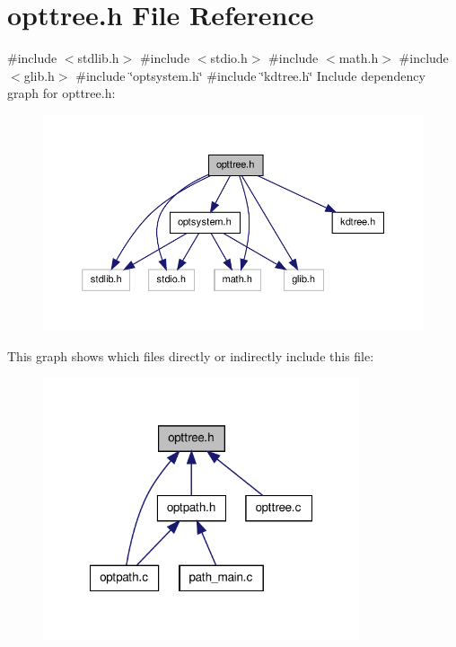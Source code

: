 \hypertarget{a00020}{\section{opttree.\-h \-File \-Reference}
\label{db/db2/a00020}
}
{\ttfamily \#include $<$stdlib.\-h$>$}\*
{\ttfamily \#include $<$stdio.\-h$>$}\*
{\ttfamily \#include $<$math.\-h$>$}\*
{\ttfamily \#include $<$glib.\-h$>$}\*
{\ttfamily \#include \char`\"{}optsystem.\-h\char`\"{}}\*
{\ttfamily \#include \char`\"{}kdtree.\-h\char`\"{}}\*
\-Include dependency graph for opttree.\-h\-:
\nopagebreak
\begin{figure}[H]
\begin{center}
\leavevmode
\includegraphics[width=350pt]{dc/d87/a00032}
\end{center}
\end{figure}
\-This graph shows which files directly or indirectly include this file\-:
\nopagebreak
\begin{figure}[H]
\begin{center}
\leavevmode
\includegraphics[width=264pt]{d0/dc0/a00033}
\end{center}
\end{figure}
